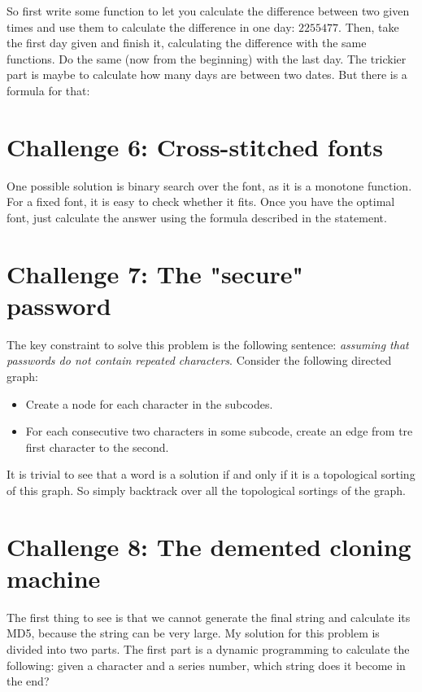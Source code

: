 \documentclass[english,12pt,a4paper]{article}
\begin{document}
So first write some function to let you calculate the difference between two given times and use them to calculate the difference in one day: $2255477$. Then, take the first day given and finish it, calculating the difference with the same functions. Do the same (now from the beginning) with the last day. The trickier part is maybe to calculate how many days are between two dates. But there is a formula for that:


\newpage

\section{Challenge 6: Cross-stitched fonts}
One possible solution is binary search over the font, as it is a monotone function. For a fixed font, it is easy to check whether it fits. Once you have the optimal font, just calculate the answer using the formula described in the statement.


\newpage

\section{Challenge 7: The "secure" password}
The key constraint to solve this problem is the following sentence: \textit{assuming that passwords do not contain repeated characters}. Consider the following directed graph:
\begin{itemize}
\item Create a node for each character in the subcodes.
\item For each consecutive two characters in some subcode, create an edge from tre first character to the second.
\end{itemize}
It is trivial to see that a word is a solution if and only if it is a topological sorting of this graph. So simply backtrack over all the topological sortings of the graph.


\newpage

\section{Challenge 8: The demented cloning machine}
The first thing to see is that we cannot generate the final string and calculate its MD5, because the string can be very large. My solution for this problem is divided into two parts. The first part is a dynamic programming to calculate the following: given a character and a series number, which string does it become in the end?
\end{document}
